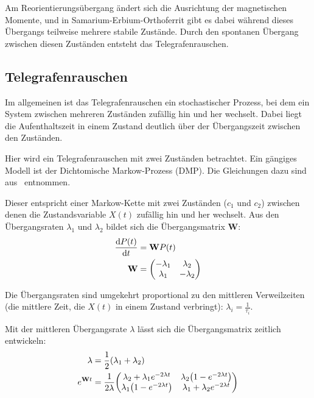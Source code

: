 \documentclass[main.tex]{subfiles}
\begin{document}
Am Reorientierungsübergang ändert sich die Ausrichtung der magnetischen Momente, und in Samarium-Erbium-Orthoferrit gibt es dabei während dieses Übergangs teilweise mehrere stabile Zustände. Durch den spontanen Übergang zwischen diesen Zuständen entsteht das Telegrafenrauschen.

\newpage
\subsection{Telegrafenrauschen}

Im allgemeinen ist das Telegrafenrauschen ein stochastischer Prozess, bei dem ein System zwischen mehreren Zuständen zufällig hin und her wechselt. Dabei liegt die Aufenthaltszeit in einem Zustand deutlich über der Übergangszeit zwischen den Zuständen.

Hier wird ein Telegrafenrauschen mit zwei Zuständen betrachtet.
Ein gängiges Modell ist der Dichtomische Markow-Prozess (DMP).
Die Gleichungen dazu sind aus~\cite{matphys} entnommen.

Dieser entspricht einer Markow-Kette mit zwei Zuständen (\(c_1\) und \(c_2\))
zwischen denen die Zustandsvariable \(X(t)\) zufällig hin und her wechselt. Aus
den Übergangsraten \(\lambda_1\) und \(\lambda_2\) bildet sich die
Übergangsmatrix \(\mathbf{W}\):
\begin{align}
	\dv{P(t)}{t} & = \mathbf{W} P(t) \\
	\mathbf{W}   & = \mqty(
	-\lambda_1   & \lambda_2         \\
	\lambda_1    & -\lambda_2)
\end{align}

Die Übergangsraten sind umgekehrt proportional zu den mittleren Verweilzeiten
(die mittlere Zeit, die \(X(t)\) in einem Zustand verbringt): \(\lambda_i =
\frac{1}{\tau_i}\).

Mit der mittleren Übergangsrate \(\lambda\) lässt sich die Übergangsmatrix
zeitlich entwickeln:
\begin{align}
	\lambda                            & = \frac{1}{2} \qty(\lambda_1 +
	\lambda_2)
	\\
	e^{\mathbf{W}t}                    & = \frac{1}{2\lambda}
	\mqty(\lambda_2 + \lambda_1
	e^{-2\lambda t}                    & \lambda_2 \qty(1- e^{-2\lambda t})
	\\
	\lambda_1 \qty(1- e^{-2\lambda t}) & \lambda_1 + \lambda_2 e^{-2\lambda
		t})
\end{align}
\end{document}

